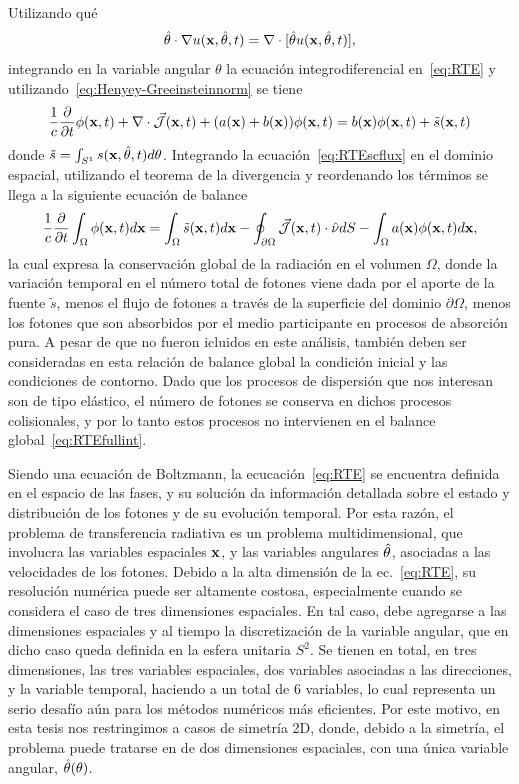 Utilizando qué
\begin{equation}
\hat{\theta} \cdot \nabla u(\mathbf{x},\hat{\theta},t)=\nabla \cdot [\hat{\theta} u(\mathbf{x},\hat{\theta},t)],
\label{eq:scdiv}
\end{equation}
integrando en la variable angular $\theta$
 la ecuación integrodiferencial en~\eqref{eq:RTE} y utilizando~\eqref{eq:Henyey-Greeinsteinnorm}  se tiene
\begin{equation}
\frac{1}{c}\frac{\partial}{\partial t} \phi(\mathbf{x},t)+\nabla \cdot \vec{ \mathcal{J}}(\mathbf{x},t)
+(a(\mathbf{x})+b(\mathbf{x})) \phi(\mathbf{x},t)=b(\mathbf{x})\phi(\mathbf{x},t)+\tilde{s}(\mathbf{x},t)
\label{eq:RTEscflux}
\end{equation}
donde $\tilde{s}=\int_{S^1}s(\mathbf{x},\hat{\theta},t)d\theta$. Integrando la 
ecuación~\eqref{eq:RTEscflux} en el dominio espacial, utilizando el teorema de la divergencia
y reordenando los términos se llega a la siguiente ecuación de balance
\begin{equation}
\frac{1}{c}\frac{\partial}{\partial t} \int_{\Omega}\phi(\mathbf{x},t)d\mathbf{x} = 
\int_{\Omega}\tilde{s}(\mathbf{x},t)d\mathbf{x}- \oint_{\partial \Omega} \vec{ \mathcal{J}}(\mathbf{x},t)\cdot \hat{\nu} dS-\int_{\Omega}a(\mathbf{x})\phi(\mathbf{x},t)d\mathbf{x},
\label{eq:RTEfullint}
\end{equation}
la cual expresa la conservación global de la radiación en el volumen $\Omega$, 
donde la variación temporal en el número total de fotones 
viene dada por el aporte de la fuente $\tilde{s}$, menos el flujo de fotones
 a través de la superficie del 
dominio $\partial \Omega$, menos los fotones que son absorbidos 
por el medio participante en procesos de absorción pura. 
A pesar de que no fueron icluidos en este análisis, 
también deben ser consideradas en esta relación de balance global la condición inicial y las 
condiciones de contorno. Dado que 
los procesos de dispersión que nos interesan son de tipo elástico, el número 
de fotones se conserva en dichos procesos colisionales, y por lo tanto 
estos procesos no intervienen en el balance global~\eqref{eq:RTEfullint}. 

Siendo una ecuación de Boltzmann, la ecucación~\eqref{eq:RTE} 
se encuentra definida en el espacio de las fases, 
y su solución da información detallada sobre el estado y distribución 
de los fotones y de su evolución temporal.   Por esta razón, 
el problema de transferencia radiativa es un problema multidimensional, 
que involucra las variables espaciales $\mathbf{x}$, y las variables angulares 
$\hat{\theta}$, asociadas a las velocidades de los fotones. 
Debido a la alta dimensión de la ec.~\eqref{eq:RTE}, su resolución numérica 
puede ser altamente costosa, especialmente cuando se considera el caso de 
tres dimensiones espaciales. En tal caso, debe agregarse a las dimensiones 
espaciales y al tiempo la discretización de la variable angular, 
que en dicho caso queda definida en la esfera unitaria $S^2$. 
Se tienen en total, en tres dimensiones, las tres variables espaciales, 
dos variables asociadas a las direcciones, y la variable temporal, haciendo 
a un total de 6 variables, lo cual representa un serio desafío 
aún para los métodos numéricos más eficientes. 
Por este motivo, en esta tesis nos restringimos a casos de 
simetría 2D, donde, debido a la simetría, el 
problema puede tratarse en de dos dimensiones espaciales, 
con una única variable angular, $\hat{\theta}(\theta)$.


